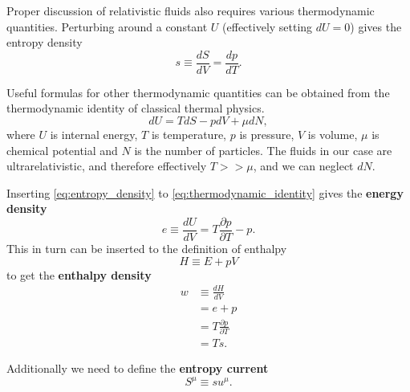 \iffalse
The
\href{https://en.wikipedia.org/wiki/Clausius\%E2\%80\%93Clapeyron_relation}{Clausius-Clapeyron relation} states that
\cite[eq. 5.47, 5.48]{schroeder_thermal_2000}
\begin{equation}
\frac{dp}{dT} = \frac{L}{T \Delta V} = \frac{\Delta S}{\Delta V}.
\end{equation}
\fi

Proper discussion of relativistic fluids also requires various thermodynamic quantities.
Perturbing around a constant $U$ (effectively setting $dU=0$) gives the entropy density
\cite[p. 23]{lecture_notes}
\begin{equation}
s \equiv \frac{dS}{dV} = \frac{dp}{dT}.
\label{eq:entropy_density}
\end{equation}

Useful formulas for other thermodynamic quantities can be obtained from the thermodynamic identity of classical thermal physics.
\cites[eq. 2.136]{rezzolla_relativistic_2013}[eq. 3.68]{schroeder_thermal_2000}
\begin{equation}
dU = TdS - pdV + \mu dN,
\label{eq:thermodynamic_identity}
\end{equation}
where $U$ is internal energy, $T$ is temperature, $p$ is pressure, $V$ is volume, $\mu$ is chemical potential and $N$ is the number of particles.
The fluids in our case are ultrarelativistic, and therefore effectively $T >> \mu$,
and we can neglect $dN$.

Inserting \eqref{eq:entropy_density} to \eqref{eq:thermodynamic_identity} gives the \textbf{energy density}
\begin{equation}
e \equiv \frac{dU}{dV} = T \frac{\partial p}{\partial T} - p.
\end{equation}
This in turn can be inserted to the definition of enthalpy
\cite[eq. 1.51]{schroeder_thermal_2000}
\begin{equation}
H \equiv E + pV
\end{equation}
to get the \textbf{enthalpy density}
\begin{align}
w
&\equiv \frac{dH}{dV} \\
&= e+p \\
&= T \frac{\partial p}{\partial T} \\
&= Ts.
\end{align}
\iffalse
Additionally we need to define the \textbf{specific enthalpy} \cite[eq. 2.141]{rezzolla_relativistic_2013}
\begin{equation}
h = \frac{e+p}{\rho},
\label{eq:specific_enthalpy}
\end{equation}
where $\rho$ is the rest-mass density, and the \textbf{entropy current}
\fi
Additionally we need to define the \textbf{entropy current}
\cite[p. 23]{lecture_notes}
\begin{equation}
S^\mu \equiv su^\mu.
\end{equation}



